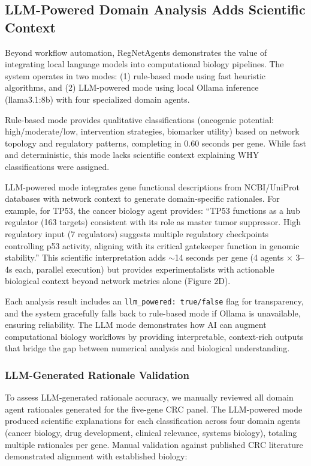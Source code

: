 \documentclass[11pt]{article}
\begin{document}
\subsection{LLM-Powered Domain Analysis Adds Scientific Context}

Beyond workflow automation, RegNetAgents demonstrates the value of integrating local language models into computational biology pipelines. The system operates in two modes: (1) rule-based mode using fast heuristic algorithms, and (2) LLM-powered mode using local Ollama inference (llama3.1:8b) with four specialized domain agents.

Rule-based mode provides qualitative classifications (oncogenic potential: high/moderate/low, intervention strategies, biomarker utility) based on network topology and regulatory patterns, completing in 0.60 seconds per gene. While fast and deterministic, this mode lacks scientific context explaining WHY classifications were assigned.

LLM-powered mode integrates gene functional descriptions from NCBI/UniProt databases with network context to generate domain-specific rationales. For example, for TP53, the cancer biology agent provides: ``TP53 functions as a hub regulator (163 targets) consistent with its role as master tumor suppressor. High regulatory input (7 regulators) suggests multiple regulatory checkpoints controlling p53 activity, aligning with its critical gatekeeper function in genomic stability.'' This scientific interpretation adds $\sim$14 seconds per gene (4 agents $\times$ 3--4s each, parallel execution) but provides experimentalists with actionable biological context beyond network metrics alone (Figure 2D).

Each analysis result includes an \texttt{llm\_powered: true/false} flag for transparency, and the system gracefully falls back to rule-based mode if Ollama is unavailable, ensuring reliability. The LLM mode demonstrates how AI can augment computational biology workflows by providing interpretable, context-rich outputs that bridge the gap between numerical analysis and biological understanding.

\subsubsection{LLM-Generated Rationale Validation}

To assess LLM-generated rationale accuracy, we manually reviewed all domain agent rationales generated for the five-gene CRC panel. The LLM-powered mode produced scientific explanations for each classification across four domain agents (cancer biology, drug development, clinical relevance, systems biology), totaling multiple rationales per gene. Manual validation against published CRC literature demonstrated alignment with established biology:
\end{document}
